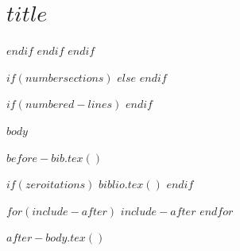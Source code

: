 \section[Introduction]{$title$}
$endif$
$endif$
$endif$

$if(numbersections)$
\setcounter{secnumdepth}{$if(secnumdepth)$$secnumdepth$$else$5$endif$}
$else$
\setcounter{secnumdepth}{-\maxdimen} %
$endif$

\setlength\LTleft{0pt}

$if(numbered-lines)$
\resetlinenumber[1]
$endif$

$body$

$before-bib.tex()$

$if(zeroitations)$
$biblio.tex()$
$endif$

$for(include-after)$
$include-after$
$endfor$

$after-body.tex()$


